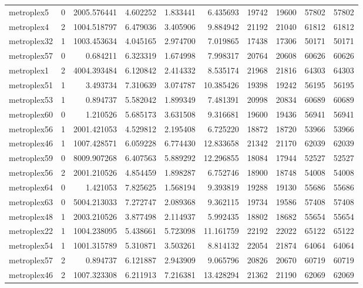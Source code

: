 \begin{longtable}{|l|r|r|r|r|r|r|r|r|r|}
metroplex5 & 0 & 2005.576441 & 4.602252 & 1.833441 & 6.435693 & 19742 & 19600 & 57802 & 57802 \\
metroplex4 & 2 & 1004.518797 & 6.479036 & 3.405906 & 9.884942 & 21192 & 21040 & 61812 & 61812 \\
metroplex32 & 1 & 1003.453634 & 4.045165 & 2.974700 & 7.019865 & 17438 & 17306 & 50171 & 50171 \\
metroplex57 & 0 & 0.684211 & 6.323319 & 1.674998 & 7.998317 & 20764 & 20608 & 60626 & 60626 \\
metroplex1 & 2 & 4004.393484 & 6.120842 & 2.414332 & 8.535174 & 21968 & 21816 & 64303 & 64303 \\
metroplex51 & 1 & 3.493734 & 7.310639 & 3.074787 & 10.385426 & 19398 & 19242 & 56195 & 56195 \\
metroplex53 & 1 & 0.894737 & 5.582042 & 1.899349 & 7.481391 & 20998 & 20834 & 60689 & 60689 \\
metroplex60 & 0 & 1.210526 & 5.685173 & 3.631508 & 9.316681 & 19600 & 19436 & 56941 & 56941 \\
metroplex56 & 1 & 2001.421053 & 4.529812 & 2.195408 & 6.725220 & 18872 & 18720 & 53966 & 53966 \\
metroplex46 & 1 & 1007.428571 & 6.059228 & 6.774430 & 12.833658 & 21342 & 21170 & 62039 & 62039 \\
metroplex59 & 0 & 8009.907268 & 6.407563 & 5.889292 & 12.296855 & 18084 & 17944 & 52527 & 52527 \\
metroplex56 & 2 & 2001.210526 & 4.854459 & 1.898287 & 6.752746 & 18900 & 18748 & 54008 & 54008 \\
metroplex64 & 0 & 1.421053 & 7.825625 & 1.568194 & 9.393819 & 19288 & 19130 & 55686 & 55686 \\
metroplex63 & 0 & 5004.213033 & 7.272747 & 2.089368 & 9.362115 & 19734 & 19586 & 57408 & 57408 \\
metroplex48 & 1 & 2003.210526 & 3.877498 & 2.114937 & 5.992435 & 18802 & 18682 & 55654 & 55654 \\
metroplex22 & 1 & 1004.238095 & 5.438661 & 5.723098 & 11.161759 & 22192 & 22022 & 65122 & 65122 \\
metroplex54 & 1 & 1001.315789 & 5.310871 & 3.503261 & 8.814132 & 22054 & 21874 & 64064 & 64064 \\
metroplex57 & 2 & 0.894737 & 6.121887 & 2.943909 & 9.065796 & 20826 & 20670 & 60719 & 60719 \\
metroplex46 & 2 & 1007.323308 & 6.211913 & 7.216381 & 13.428294 & 21362 & 21190 & 62069 & 62069 \\

\end{longtable}
